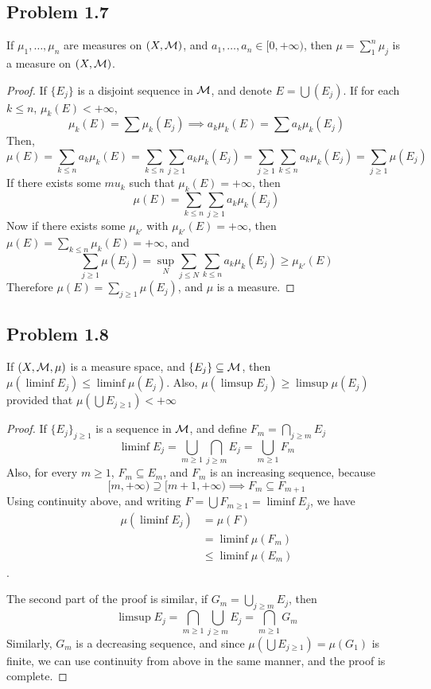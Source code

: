 \documentclass[../../main.tex]{subfiles}
\begin{document}
\subsection*{Problem 1.7}
\begin{wts}
    If $\mu_1,\ldots,\mu_n$ are measures on $(X,\mathcal{M})$, and $a_1,\ldots, a_n\in[0,+\infty)$, then $\mu = \sum^n_1\mu_j$ is a measure on $(X,\mathcal{M})$.
\end{wts}
\begin{proof}
    If $\{E_j\}$ is a disjoint sequence in $\mathcal{M}$, and denote $E = \bigcup (E_j)$. If for each $k\leq n$, $\mu_k(E)<+\infty$, 
    \[
    \mu_k(E)=\sum \mu_k(E_j)\implies a_k\mu_k(E)=\sum a_k\mu_k(E_j)
    \]
    Then,
    \[
    \mu(E)=\sum_{k\leq n}a_k\mu_k(E)= \sum_{k\leq n}\sum_{j\geq 1}a_k\mu_k(E_j)=\sum_{j\geq 1}\sum_{k\leq n}a_k\mu_k(E_j)=\sum_{j\geq 1}\mu(E_j)
    \]
    If there exists some $mu_k$ such that $\mu_k(E) = +\infty$, then 
    \[
    \mu(E) = \sum_{k\leq n}\sum_{j\geq 1}a_k\mu_k(E_j)
    \]
    Now if there exists some $\mu_{k'}$ with $\mu_{k'}(E)=+\infty$, then $\mu(E)=\sum_{k\leq n}\mu_k(E)=+\infty$, and 
    \[
    \sum_{j\geq 1}\mu(E_j)=\sup_N\sum_{j\leq N} \sum_{k\leq n}a_k\mu_k(E_j)\geq \mu_{k'}(E)
    \]
    Therefore $\mu(E)=\sum_{j\geq 1}\mu(E_j)$, and $\mu$ is a measure.
\end{proof}

\subsection*{Problem 1.8}
\begin{wts}
    If $(X,\mathcal{M},\mu)$ is a measure space, and $\{E_j\}\subseteq \mathcal{M}$, then $\mu(\liminf E_j)\leq \liminf \mu(E_j)$. Also, $\mu(\limsup E_j)\geq \limsup \mu(E_j)$ provided that $\mu(\bigcup E_{j\geq 1})<+\infty$
\end{wts}
\begin{proof}
If $\{E_j\}_{j\geq 1}$ is a sequence in $\mathcal{M}$, and define $F_m = \bigcap_{j\geq m}E_j$
\[
\liminf E_j = \bigcup_{m\geq 1}\bigcap_{j\geq m}E_j = \bigcup_{m\geq 1} F_m
\]
Also, for every $m\geq 1$, $F_m\subseteq E_m$, and $F_m$ is an increasing sequence, because
\[
[m,+\infty)\supseteq [m+1,+\infty)\implies F_m\subseteq F_{m+1}
\]
Using continuity above, and writing $F = \bigcup F_{m\geq 1}=\liminf E_j$, we have
\begin{align*}
    \mu(\liminf E_j) &= \mu(F)\\
    &= \liminf \mu(F_m)\\
    &\leq \liminf \mu(E_m)
\end{align*}.

The second part of the proof is similar, if $G_m = \bigcup_{j\geq m} E_j$, then
\[
\limsup E_j = \bigcap_{m\geq 1}\bigcup_{j\geq m} E_j = \bigcap_{m\geq 1}G_m
\]
Similarly, $G_m$ is a decreasing sequence, and since $\mu(\bigcup E_{j\geq 1}) = \mu(G_1)$ is finite, we can use continuity from above in the same manner, and the proof is complete.
\end{proof}
\end{document}
